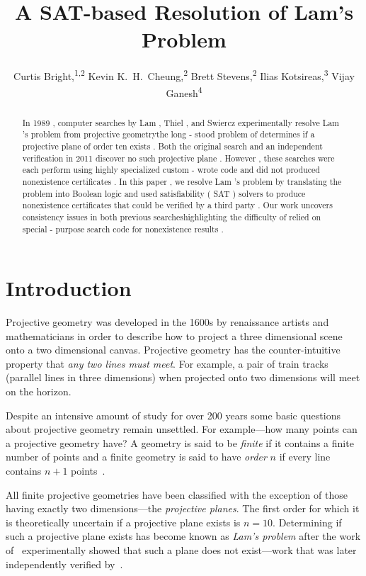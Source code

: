 \documentclass[letterpaper]{article}
\title{A SAT-based Resolution of Lam's Problem}
\author{Curtis Bright,\textsuperscript{\rm 1,2} Kevin K.~H.~Cheung,\textsuperscript{\rm 2} Brett Stevens,\textsuperscript{\rm 2} Ilias Kotsireas,\textsuperscript{\rm 3} Vijay Ganesh\textsuperscript{\rm 4}\\}
\begin{document}
\maketitle
\begin{abstract}
In 1989 , computer searches by Lam , Thiel , and Swiercz experimentally resolve Lam 's problem from projective geometrythe long - stood problem of determines if a projective plane of order ten exists . Both the original search and an independent verification in 2011 discover no such projective plane . However , these searches were each perform using highly specialized custom - wrote code and did not produced nonexistence certificates . In this paper , we resolve Lam 's problem by translating the problem into Boolean logic and used satisfiability ( SAT ) solvers to produce nonexistence certificates that could be verified by a third party . Our work uncovers consistency issues in both previous searcheshighlighting the difficulty of relied on special - purpose search code for nonexistence results . \end{abstract}

\section{Introduction}

Projective geometry was developed in the 1600s by renaissance artists
and mathematicians in order to describe how to project a three dimensional
scene onto a two dimensional canvas.  Projective geometry has
the counter-intuitive property that \emph{any two lines
must meet}.  For example, a pair of train
tracks (parallel lines in three dimensions) when projected onto two dimensions
will meet on the horizon.

Despite an intensive amount of study for over 200 years some basic questions
about projective geometry remain unsettled.  For example---how many points
can a projective geometry have?  A geometry is said to be \emph{finite}
if it contains a finite number of points and a finite geometry
is said to have \emph{order} $n$ if every line contains $n+1$ points~\cite{dembowski}.

All finite projective geometries have been classified with the exception
of those having exactly two dimensions---the \emph{projective planes}.
The first order for which it is theoretically uncertain if a projective
plane exists is $n=10$.  Determining if such a projective plane exists has
become known as \emph{Lam's problem} after the work of~\cite{lam1989non}
experimentally showed that such a plane does not exist---work
that was later independently verified by~\cite{roy2011confirmation}.
\end{document}

